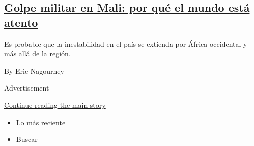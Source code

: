 \begin{enumerate}
  \hypertarget{golpe-militar-en-mali-por-quuxe9-el-mundo-estuxe1-atento}{%
  \subsection{\texorpdfstring{\href{/es/2020/08/19/espanol/mundo/mali-golpe-militar.html}{Golpe
  militar en Mali: por qué el mundo está
  atento}}{Golpe militar en Mali: por qué el mundo está atento}}\label{golpe-militar-en-mali-por-quuxe9-el-mundo-estuxe1-atento}}

  Es probable que la inestabilidad en el país se extienda por África
  occidental y más allá de la región.

  By Eric Nagourney
\end{enumerate}

Advertisement

\protect\hyperlink{after-mid1}{Continue reading the main story}

\begin{itemize}
\tightlist
\item
  \protect\hyperlink{stream-panel}{Lo más reciente}
\item
  Buscar
\end{itemize}

